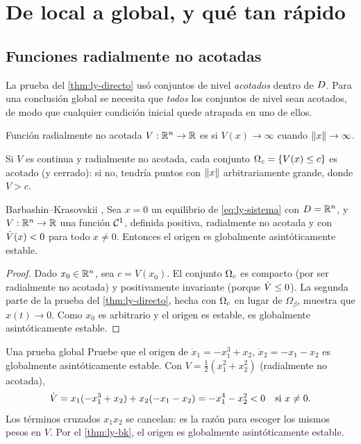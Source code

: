 \section{De local a global, y qué tan rápido}
\label{sec:ly-global}

\subsection{Funciones radialmente no acotadas}

La prueba del \cref{thm:ly-directo} usó conjuntos de nivel \emph{acotados} dentro de $D$. Para una conclusión global se necesita que \emph{todos} los conjuntos de nivel sean acotados, de modo que cualquier condición inicial quede atrapada en uno de ellos.

\begin{definicion}[label=def:ly-radial]{Función radialmente no acotada}
$V:\mathbb{R}^n\to\mathbb{R}$ es  si $V(x)\to\infty$ cuando $\left\lVert x\right\rVert\to\infty$.
\end{definicion}

Si $V$ es continua y radialmente no acotada, cada conjunto $\Omega_{c}=\{V(x)\le c\}$ es acotado (y cerrado): si no, tendría puntos con $\left\lVert x\right\rVert$ arbitrariamente grande, donde $V>c$.

\begin{teorema}[label=thm:ly-bk]{Barbashin--Krasovskii \citep{BaKr52}, \citep[Teo.~4.2]{Kha02}}
Sea $x=0$ un equilibrio de \eqref{eq:ly-sistema} con $D=\mathbb{R}^n$, y $V:\mathbb{R}^n\to\mathbb{R}$ una función $\mathcal{C}^{1}$, definida positiva, radialmente no acotada y con $\dot V(x)<0$ para todo $x\neq0$. Entonces el origen es globalmente asintóticamente estable.
\end{teorema}

\begin{proof}
Dado $x_0\in\mathbb{R}^n$, sea $c=V(x_0)$. El conjunto $\Omega_{c}$ es compacto (por ser radialmente no acotada) y positivamente invariante (porque $\dot V\le0$). La segunda parte de la prueba del \cref{thm:ly-directo}, hecha con $\Omega_{c}$ en lugar de $\Omega_\beta$, muestra que $x(t)\to0$. Como $x_0$ es arbitrario y el origen es estable, es globalmente asintóticamente estable.
\end{proof}

\begin{ejemplo}[label=ej:ly-global]{Una prueba global}
Pruebe que el origen de $\dot x_1=-x_1^3+x_2$, $\dot x_2=-x_1-x_2$ es globalmente asintóticamente estable.
\solucion Con $V=\tfrac12(x_1^2+x_2^2)$ (radialmente no acotada),
\[
  \dot V=x_1(-x_1^3+x_2)+x_2(-x_1-x_2)=-x_1^4-x_2^2<0\quad\text{si }x\neq0 .
\]
Los términos cruzados $x_1x_2$ se cancelan: es la razón para escoger los mismos pesos en $V$. Por el \cref{thm:ly-bk}, el origen es globalmente asintóticamente estable.
\end{ejemplo}

